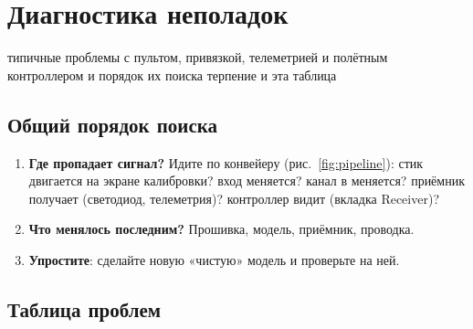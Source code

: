 \chapter{Диагностика неполадок}
\chapterintro
  {типичные проблемы с пультом, привязкой, телеметрией и полётным контроллером и
   порядок их поиска}
  {терпение и эта таблица}

\section{Общий порядок поиска}

\begin{enumerate}
  \item \textbf{Где пропадает сигнал?} Идите по конвейеру (рис.~\ref{fig:pipeline}): стик
        двигается на экране калибровки? вход меняется? канал в  меняется?
        приёмник получает (светодиод, телеметрия)? контроллер видит (вкладка Receiver)?
  \item \textbf{Что менялось последним?} Прошивка, модель, приёмник, проводка.
  \item \textbf{Упростите}: сделайте новую «чистую» модель и проверьте на ней.
\end{enumerate}

\section{Таблица проблем}


